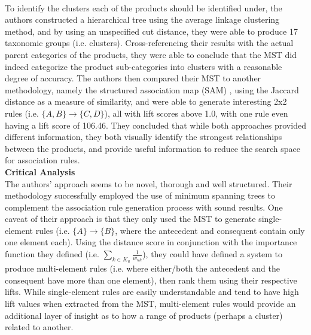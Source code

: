 \documentclass[paper=a4,fontsize=11pt]{report}	%
\newcommand{\setA}{\{A\}}
\newcommand{\setB}{\{B\}}
\newcommand{\abrule}{\setA\rightarrow\setB}
\begin{document}
\\
To identify the clusters each of the products should be identified under, the authors constructed a hierarchical tree using the average linkage clustering method, and by using an unspecified cut distance, they were able to produce 17 taxonomic groups (i.e. clusters). Cross-referencing their results with the actual parent categories of the products, they were able to conclude that the MST did indeed categorize the product sub-categories into clusters with a reasonable degree of accuracy. The authors then compared their MST to another methodology, namely the structured association map (SAM) \cite{kim}, using the Jaccard distance as a measure of similarity,  and were able to generate interesting 2x2 rules (i.e. $\{A,B\}\rightarrow\{C, D\}$), all with lift scores above 1.0, with one rule even having a lift score of 106.46. They concluded that while both approaches provided different information, they both visually identify the strongest relationships between the products, and provide useful information to reduce the search space for association rules.
\\\textbf{Critical Analysis}\\
The authors' approach seems to be novel,  thorough and well structured.  Their methodology successfully employed the use of minimum spanning trees to complement the association rule generation process with sound results.  One caveat of their approach is that they only used the MST to generate single-element rules (i.e. $\abrule$, where the antecedent and consequent contain only one element each). Using the distance score in conjunction with the importance function they defined (i.e. $\sum\limits_{k \in K_u}^{} \frac{1}{w_{uk}}$), they could have defined a system to produce multi-element rules (i.e. where either/both the antecedent and the consequent have more than one element), then rank them using their respective lifts. While single-element rules are easily understandable and tend to have high lift values when extracted from the MST, multi-element rules would provide an additional layer of insight as to how a range of products (perhaps a cluster) related to another.
\end{document}
